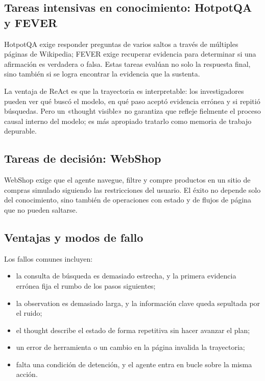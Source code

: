 \documentclass[a4paper]{article}
\begin{document}
\subsection{Tareas intensivas en conocimiento: HotpotQA y FEVER}

HotpotQA exige responder preguntas de varios saltos a través de múltiples páginas de Wikipedia; FEVER exige recuperar evidencia para determinar si una afirmación es verdadera o falsa. Estas tareas evalúan no solo la respuesta final, sino también si se logra encontrar la evidencia que la sustenta.


La ventaja de ReAct es que la trayectoria es interpretable: los investigadores pueden ver qué buscó el modelo, en qué paso aceptó evidencia errónea y si repitió búsquedas. Pero un «thought visible» no garantiza que refleje fielmente el proceso causal interno del modelo; es más apropiado tratarlo como memoria de trabajo depurable.

\subsection{Tareas de decisión: WebShop}

WebShop exige que el agente navegue, filtre y compre productos en un sitio de compras simulado siguiendo las restricciones del usuario. El éxito no depende solo del conocimiento, sino también de operaciones con estado y de flujos de página que no pueden saltarse.


\subsection{Ventajas y modos de fallo}


Los fallos comunes incluyen:

\begin{itemize}
    \item la consulta de búsqueda es demasiado estrecha, y la primera evidencia errónea fija el rumbo de los pasos siguientes;
    \item la observation es demasiado larga, y la información clave queda sepultada por el ruido;
    \item el thought describe el estado de forma repetitiva sin hacer avanzar el plan;
    \item un error de herramienta o un cambio en la página invalida la trayectoria;
    \item falta una condición de detención, y el agente entra en bucle sobre la misma acción.
\end{itemize}
\end{document}
